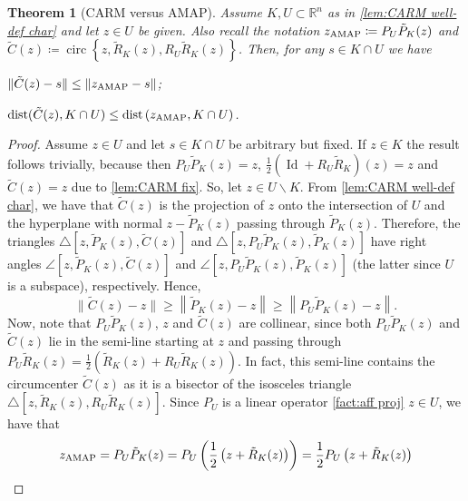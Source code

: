 \documentclass[smallextended,numbook,nospthms]{svjour3}
\theoremstyle{plain}
\newtheorem{theorem}{Theorem}[section]
\theoremstyle{definition}
\def\RR{\mathds R}
\DeclareMathOperator{\Id}{Id}
\DeclareMathOperator{\dist}{dist}
\DeclareMathOperator{\circum}{circ}
\newcommand{\AMAP}{{\rm AMAP}}
\begin{document}
\begin{theorem}[CARM versus AMAP]\label{thm:CARM x AMAP} Assume $K, U \subset \RR^{n}$ as in  \cref{lem:CARM well-def char} and let $z \in U$ be given. Also recall the notation $z_{\mathrm{\AMAP}}\coloneqq P_{U}\tilde{P}_{K}(z)$ and $\tilde{C}(z)\coloneqq \circum \left\{z, \tilde{R}_{K}(z), R_{U} \tilde{R}_{K}(z)\right\}$.
	Then, for any $s \in K \cap U$ we have
	\begin{listi}
		\item $\|\tilde{C}(z)-s\| \leq\left\|z_{\AMAP}-s\right\|$;
		\item $\dist(\tilde{C}(z), K \cap U) \leq \dist\left(z_{\mathrm{\AMAP}}, K \cap U\right)$.
	\end{listi}
\end{theorem}
\begin{proof}
	Assume $z \in U$ and let $s \in K \cap U$ be arbitrary but fixed. If $z \in K$ the result follows trivially, because then $P_{U} \tilde{P}_{K}(z)=z$, $\frac{1}{2}\left(\Id+R_{U} \tilde{R}_{K}\right)(z)=z$ and $\tilde{C}(z)=z$ due to  \cref{lem:CARM fix}. So, let $z \in U \backslash K$. From  \cref{lem:CARM well-def char}, we have that $\tilde{C}(z)$ is the projection of $z$ onto the intersection of $U$ and the hyperplane with normal $z-\tilde{P}_{K}(z)$ passing through $\tilde{P}_{K}(z)$. Therefore, the triangles $\triangle{[z, \tilde{P}_{K}(z), \tilde{C}(z)]}$ and $\triangle{[z, P_{U}\tilde{P}_{K}(z), \tilde{P}_{K}(z)]}$ have right angles $\angle{[z, \tilde{P}_{K}(z), \tilde{C}(z)]}$ and $\angle{[z,P_{U}\tilde{P}_{K}(z), \tilde{P}_{K}(z)]}$ (the latter since $U$ is a subspace), respectively. Hence,
	\begin{equation}\label{eq:myopic 1}
		\|\tilde{C}(z)-z\| \geq\left\|\tilde{P}_{K}(z)-z\right\| \geq\left\|P_{U}\tilde{P}_{K}(z)-z\right\|.	\end{equation}
	Now, note that $P_{U}\tilde{P}_{K}(z)$, $z$ and $\tilde{C}(z)$ are collinear, since both $P_{U} \tilde{P}_{K}(z)$ and $\tilde{C}(z)$ lie in the semi-line starting at $z$ and passing through $P_{U}\tilde{R}_{K}(z)=\frac{1}{2}\left(\tilde{R}_{K}(z)+R_{U}\tilde{R}_{K}(z)\right)$. In fact, this semi-line contains the circumcenter $\tilde{C}(z)$ as it is a bisector of the isosceles triangle $\triangle{[z, \tilde{R}_{K}(z),R_{U}\tilde{R}_{K}(z)]}$. Since $P_{U}$ is a linear operator \cref{fact:aff proj} $z \in U$, we have that
	\begin{align}
		z_{\mathrm{\AMAP}} &=P_{U} \tilde{P}_{K}(z)=P_{U}\left(\frac{1}{2}\left(z+\tilde{R}_{K}(z)\right)\right)=\frac{1}{2} P_{U}\left(z+\tilde{R}_{K}(z)\right) \\

\end{align}
\end{proof}
\end{document}
